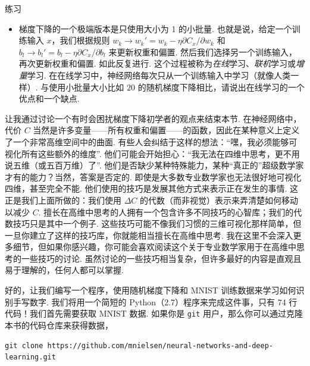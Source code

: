 \begin{exerciseBox}{练习}

\begin{itemize}

\item 梯度下降的一个极端版本是只使用大小为 1 的小批量. 也就是说，给定一个训练输入 $x$，我们根据规则 $w_k \rightarrow w_k' = w_k - \eta \partial C_x / \partial w_k$ 和 $b_l \rightarrow b_l' = b_l - \eta \partial C_x / \partial b_l$ 来更新权重和偏置. 然后我们选择另一个训练输入，再次更新权重和偏置. 如此反复进行. 这个过程被称为\emph{在线}学习、\emph{联机}学习或\emph{增量}学习. 在在线学习中，神经网络每次只从一个训练输入中学习（就像人类一样）. 与使用小批量大小比如 $20$ 的随机梯度下降相比，请说出在线学习的一个优点和一个缺点.

\end{itemize}

让我通过讨论一个有时会困扰梯度下降初学者的观点来结束本节. 在神经网络中，代价 $C$ 当然是许多变量——所有权重和偏置——的函数，因此在某种意义上定义了一个非常高维空间中的曲面. 有些人会纠结于这样的想法：``嘿，我必须能够可视化所有这些额外的维度''. 他们可能会开始担心：``我无法在四维中思考，更不用说五维（或五百万维）了''. 他们是否缺少某种特殊能力，某种``真正的''超级数学家才有的能力？当然，答案是否定的. 即使是大多数专业数学家也无法很好地可视化四维，甚至完全不能. 他们使用的技巧是发展其他方式来表示正在发生的事情. 这正是我们上面所做的：我们使用 $\Delta C$ 的代数（而非视觉）表示来弄清楚如何移动以减少 $C$. 擅长在高维中思考的人拥有一个包含许多不同技巧的心智库；我们的代数技巧只是其中一个例子. 这些技巧可能不像我们习惯的三维可视化那样简单，但一旦你建立了这样的技巧库，你就能相当擅长在高维中思考. 我在这里不会深入更多细节，但如果你感兴趣，你可能会喜欢阅读这个关于专业数学家用于在高维中思考的一些技巧的讨论. 虽然讨论的一些技巧相当复杂，但许多最好的内容是直观且易于理解的，任何人都可以掌握.

\end{exerciseBox}

好的，让我们编写一个程序，使用随机梯度下降和 MNIST 训练数据来学习如何识别手写数字. 我们将用一个简短的 Python（2.7）程序来完成这件事，只有 74 行代码！我们首先需要获取 MNIST 数据. 如果你是 \texttt{git} 用户，那么你可以通过克隆本书的代码仓库来获得数据，

\begin{lstlisting}
git clone https://github.com/mnielsen/neural-networks-and-deep-learning.git

\end{lstlisting}

